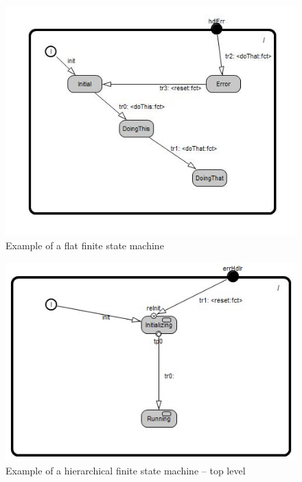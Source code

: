 \begin{figure}
\includegraphics[scale=0.7]{images/040-FlatFSM.jpg}
\caption{Example of a flat finite state machine}
\end{figure}

\begin{figure}
\includegraphics[scale=0.7]{images/040-HierarchicalFSMTop.jpg}
\caption{Example of a hierarchical finite state machine -- top level}
\end{figure}

